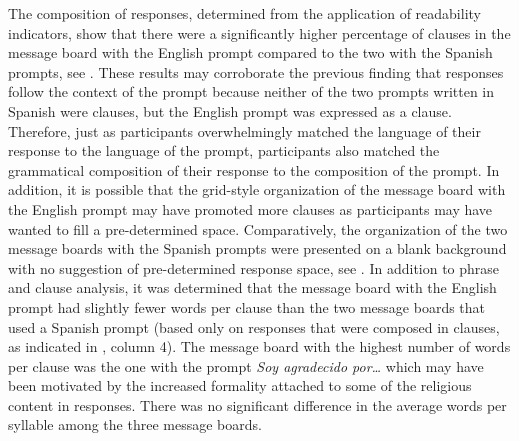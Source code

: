 \documentclass[output=paper,colorlinks,citecolor=brown]{langscibook}
\begin{document}
The composition of responses, determined from the application of readability indicators, show that there were a significantly higher percentage of clauses in the message board with the English prompt compared to the two with the Spanish prompts, see . These results may corroborate the previous finding that responses follow the context of the prompt because neither of the two prompts written in Spanish were clauses, but the English prompt was expressed as a clause. Therefore, just as participants overwhelmingly matched the language of their response to the language of the prompt, participants also matched the grammatical composition of their response to the composition of the prompt. In addition, it is possible that the grid-style organization of the message board with the English prompt may have promoted more clauses as participants may have wanted to fill a pre-determined space. Comparatively, the organization of the two message boards with the Spanish prompts were presented on a blank background with no suggestion of pre-determined response space, see . In addition to phrase and clause analysis, it was determined that the message board with the English prompt had slightly fewer words per clause than the two message boards that used a Spanish prompt (based only on responses that were composed in clauses, as indicated in , column 4). The message board with the highest number of words per clause was the one with the prompt \emph{Soy agradecido por…} which may have been motivated by the increased formality attached to some of the religious content in responses. There was no significant difference in the average words per syllable among the three message boards.

\begin{table}[!ht]
\centering
\setlength{\tabcolsep}{4pt}
\caption{Summary of data on message-boards classified by composition of responses}
\label{tab:tab3_07}
\end{table}
\end{document}
